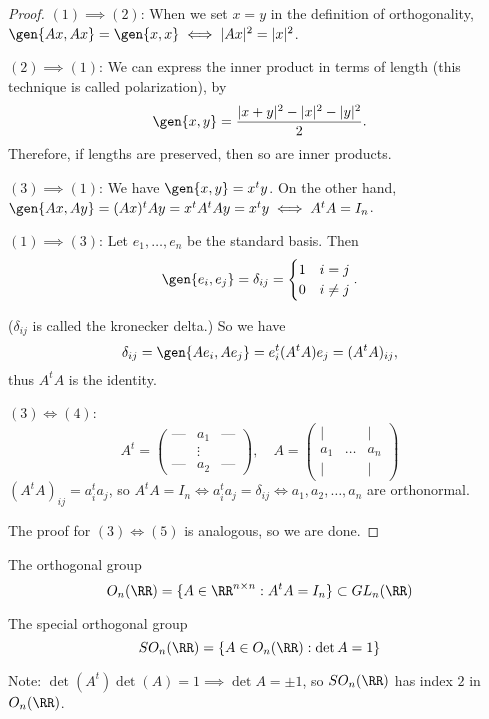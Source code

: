 \begin{proof}
$(1)\implies (2)$: When we set $x=y$ in the definition of orthogonality, $\gen{Ax, Ax} = \gen{x,x}\iff \vert Ax\vert^2 = \vert x\vert^2$. 

$(2)\implies (1)$: We can express the inner product in terms of length (this technique is called \ac{polarization}), by 
\[\gen{x,y} = \frac{\vert x+y\vert^2 - \vert x\vert^2 - \vert y\vert^2}{2}.\]
Therefore, if lengths are preserved, then so are inner products. 

$(3)\implies (1)$: We have $\gen{x,y} = x^ty$. On the other hand, $\gen{Ax, Ay} = (Ax)^tAy = x^tA^tAy = x^ty\iff A^tA = I_n$. 

$(1)\implies (3)$: Let $e_1, \hdots, e_n$ be the standard basis. Then \[\gen{e_i, e_j} = \delta_{ij} = \begin{cases}1 & i=j \\ 0 & i\neq j\end{cases}.\]

($\delta_{ij}$ is called the \ac{kronecker delta}.) So we have 
\[\delta_{ij} = \gen{Ae_i, Ae_j} = e_i^t(A^tA)e_j = (A^tA)_{ij},\]
thus $A^tA$ is the identity.

$(3)\iff (4)$: 
\[A^t = \begin{pmatrix}
    \text{---} & a_1 & \text{---} \\
     & \vdots & \\
    \text{---} & a_2 & \text{---}
\end{pmatrix}, \quad A = \begin{pmatrix}
    \vert & & \vert \\
    a_1   & \hdots & a_n   \\
    \vert & & \vert
\end{pmatrix}\]
$(A^tA)_{ij} = a_i^ta_j$, so $A^tA = I_n\iff a_i^ta_j = \delta_{ij}\iff a_1, a_2, \hdots, a_n$ are orthonormal. 

The proof for $(3)\iff (5)$ is analogous, so we are done. 
\end{proof}

\begin{definition}

The \ac{orthogonal group}
\[O_n(\RR) = \{A\in \RR^{n\times n} : A^tA = I_n\}\subset GL_n(\RR)\]
\end{definition}

\begin{definition}

The \ac{special orthogonal group}
\[SO_n(\RR) = \{A \in O_n(\RR) : \det A = 1\}\]
\end{definition}

Note: $\det (A^t)\det (A) = 1 \implies \det A = \pm 1$, so $SO_n(\RR)$ has index $2$ in $O_n(\RR)$. 




